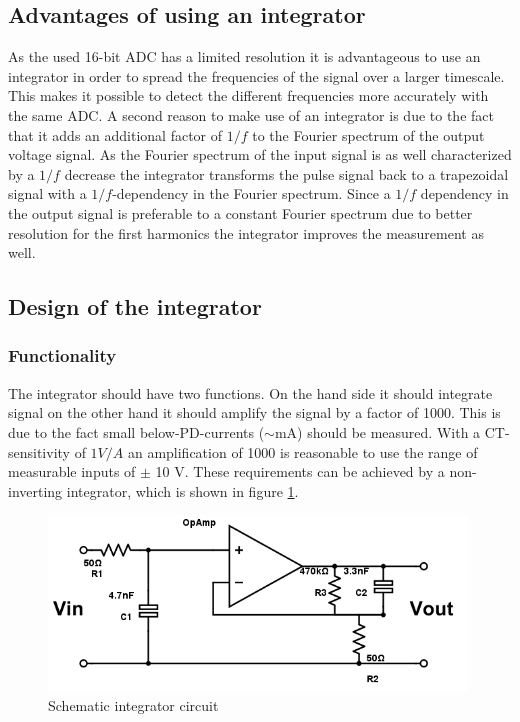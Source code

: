 \subsection{Advantages of using an integrator}
As the used 16-bit ADC has a limited resolution it is advantageous to use an integrator in order to spread the frequencies of the signal over a larger timescale. This makes it possible to detect the different frequencies more accurately with the same ADC. 
A second reason to make use of an integrator is due to the fact that it adds an additional factor of $1/f$ to the Fourier spectrum of the output voltage signal. As the Fourier spectrum of the input signal is as well characterized by a $1/f$ decrease the integrator transforms the pulse signal back to a trapezoidal signal with a $1/f$-dependency in the Fourier spectrum. Since a $1/f$ dependency in the output signal is preferable to a constant Fourier spectrum due to better resolution for the first harmonics the integrator improves the measurement as well. 

\subsection{Design of the integrator}
\subsubsection{Functionality}
The integrator should have two functions. On the hand side it should integrate signal on the other hand it should amplify the signal by a factor of 1000. This is due to the fact small below-PD-currents ($\sim$mA) should be measured. With a CT-sensitivity of $1V/A$ an amplification of 1000 is reasonable to use the range of measurable inputs of $\pm$ 10 V. These requirements can be achieved by a non-inverting integrator, which is shown in figure  \ref{fig.circuit}. 

\begin{figure}[h!tb]
\includegraphics[width=0.99\textwidth]{figures/Method/integrator/circuit.png}
    \caption{Schematic integrator circuit}
    \label{fig.circuit}
    \end{figure}	

